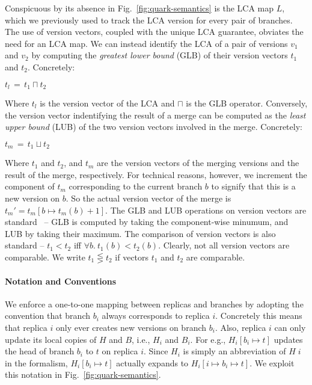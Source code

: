 Conspicuous by its absence in Fig.~\ref{fig:quark-semantics} is the
LCA map $L$, which we previously used to track the LCA version for
every pair of branches. The use of version vectors, coupled with the
unique LCA guarantee, obviates the need for an LCA map.  We can
instead identify the LCA of a pair of versions $v_1$ and $v_2$ by
computing the \emph{greatest lower bound} (GLB) of their version
vectors $t_1$ and $t_2$. Concretely:
\begin{center}
  $t_l \,=\, t_1 \sqcap t_2$
\end{center}
Where $t_l$ is the version vector of the LCA and $\sqcap$ is the GLB
operator. Conversely, the version vector indentifying the result of a
merge can be computed as the \emph{least upper bound} (LUB) of the two
version vectors involved in the merge. Concretely:
\begin{center}
  $t_m \,=\, t_1 \sqcup t_2$
\end{center}
Where $t_1$ and $t_2$, and $t_m$ are the version vectors of the
merging versions and the result of the merge, respectively. For
technical reasons, however, we increment the component of $t_m$
corresponding to the current branch $b$ to signify that this is a new
version on $b$. So the actual version vector of the merge is $t_m' =
t_m[b \mapsto t_m(b)+1]$. The GLB and LUB operations on version
vectors are standard~\cite{vectorclock} -- GLB is computed by taking
the component-wise minumum, and LUB by taking their maximum. The
comparison of version vectors is also standard -- $t_1 < t_2$ iff
$\forall b.~t_1(b) < t_2(b)$. Clearly, not all version vectors are
comparable. We write $t_1 \lesseqgtr t_2$ if vectors $t_1$ and $t_2$
are comparable.

\paragraph{Notation and Conventions} We enforce a one-to-one mapping
between replicas and branches by adopting the convention that branch
$b_i$ always corresponds to replica $i$. Concretely this means that
replica $i$ only ever creates new versions on branch $b_i$. Also,
replica $i$ can only update its local copies of $H$ and $B$, i.e.,
$H_i$ and $B_i$. For e.g., $H_i[b_i \mapsto t]$ updates the head of
branch $b_i$ to $t$ on replica $i$.  Since $H_i$ is simply an
abbreviation of $H\;i$ in the formalism, $H_i[b_i \mapsto t]$ actually
expands to $H_i[i \mapsto b_i \mapsto t]$. We exploit this notation in
Fig.~\ref{fig:quark-semantics}. 


